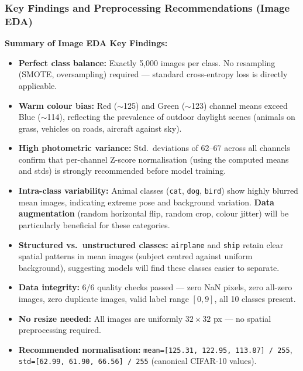 \documentclass[twoside]{hcmut-report}
\begin{document}
\subsubsection{Key Findings and Preprocessing Recommendations (Image EDA)}

\begin{importantbox}
\textbf{Summary of Image EDA Key Findings:}
\begin{itemize}
    \item \textbf{Perfect class balance:} Exactly 5{,}000 images per class. No resampling (SMOTE, oversampling) required --- standard cross-entropy loss is directly applicable.
    \item \textbf{Warm colour bias:} Red ($\sim$125) and Green ($\sim$123) channel means exceed Blue ($\sim$114), reflecting the prevalence of outdoor daylight scenes (animals on grass, vehicles on roads, aircraft against sky).
    \item \textbf{High photometric variance:} Std.\ deviations of 62--67 across all channels confirm that per-channel Z-score normalisation (using the computed means and stds) is strongly recommended before model training.
    \item \textbf{Intra-class variability:} Animal classes (\texttt{cat}, \texttt{dog}, \texttt{bird}) show highly blurred mean images, indicating extreme pose and background variation. \textbf{Data augmentation} (random horizontal flip, random crop, colour jitter) will be particularly beneficial for these categories.
    \item \textbf{Structured vs.\ unstructured classes:} \texttt{airplane} and \texttt{ship} retain clear spatial patterns in mean images (subject centred against uniform background), suggesting models will find these classes easier to separate.
    \item \textbf{Data integrity:} 6/6 quality checks passed --- zero NaN pixels, zero all-zero images, zero duplicate images, valid label range $[0, 9]$, all 10 classes present.
    \item \textbf{No resize needed:} All images are uniformly $32\times32$ px --- no spatial preprocessing required.
    \item \textbf{Recommended normalisation:} \texttt{mean=[125.31, 122.95, 113.87] / 255}, \texttt{std=[62.99, 61.90, 66.56] / 255} (canonical CIFAR-10 values).
\end{itemize}
\end{importantbox}


\end{document}

